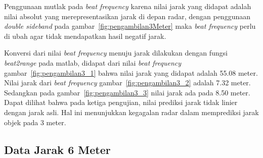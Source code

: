 Penggunaan mutlak pada \textit{beat frequency} karena nilai jarak yang didapat adalah nilai absolut yang merepresentasikan jarak di depan radar, dengan penggunaan \textit{double sideband} pada gambar~\ref{fig:pengambilan3Meter} maka \textit{beat frequency} perlu di ubah agar tidak mendapatkan hasil negatif jarak.

Konversi dari nilai \textit{beat frequency} menuju jarak dilakukan dengan fungsi \textit{beat2range} pada matlab, didapat dari nilai \textit{beat frequency} gambar~\ref{fig:pengambilan3_1} bahwa nilai jarak yang didapat adalah 55.08 meter. Nilai jarak dari \textit{beat frequency} gambar~\ref{fig:pengambilan3_2} adalah 7.32 meter. Sedangkan pada gambar~\ref{fig:pengambilan3_3} nilai jarak ada pada 8.50 meter. Dapat dilihat bahwa pada ketiga pengujian, nilai prediksi jarak tidak linier dengan jarak asli. Hal ini menunjukkan kegagalan radar dalam memprediksi jarak objek pada 3 meter.

\subsection{Data Jarak 6 Meter}

